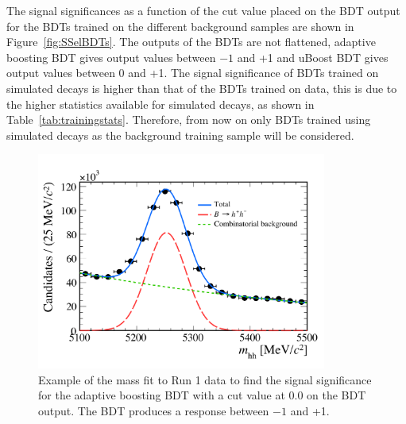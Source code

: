 The signal significances as a function of the cut value placed on the BDT output for the BDTs trained on the different background samples are shown in Figure~\ref{fig:SSelBDTs}. The outputs of the BDTs are not flattened, adaptive boosting BDT gives output values between $-1$ and +1 and uBoost BDT gives output values between 0 and +1. The signal significance of BDTs trained on simulated decays is higher than that of the BDTs trained on data, this is due to the higher statistics available for simulated decays, as shown in Table~\ref{tab:trainingstats}. %
Therefore, from now on only BDTs trained using simulated decays as the background training sample will be considered.
\begin{figure}[tbp]
    \centering
        \includegraphics[width=0.85\textwidth]{./Figs/Selection/mass_example.pdf}
    \caption{Example of the mass fit to \bhh Run 1 data to find the signal significance for the adaptive boosting BDT with a cut value at 0.0 on the BDT output. The BDT produces a response between $-1$ and +1.}
    \label{fig:massEG}
\end{figure}

